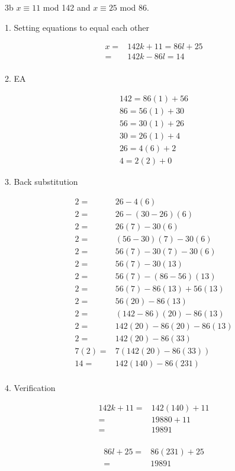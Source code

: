 \begin{question}{3b}
$x \equiv 11$ mod 142 and $x \equiv 25$ mod 86.

1. Setting equations to equal each other

\begin{align*}
x =& 142k +11 = 86l + 25\\
=& 142k -86l  = 14\\
\end{align*}

2. EA

\begin{align*}
142 = 86(1) + 56 \\
86  = 56(1) + 30 \\
56  = 30(1) + 26 \\
30  = 26(1) + 4 \\
26  = 4(6)  + 2 \\
4   = 2(2)  + 0
\end{align*}

3. Back substitution

\begin{align*}
2 =& 26 - 4(6) \\
2 =& 26 - (30 - 26)(6) \\ 
2 =& 26(7) - 30(6)\\
2 =& (56-30)(7) - 30(6)\\ 
2 =& 56(7) - 30(7) - 30(6)\\ 
2 =& 56(7) - 30(13)\\ 
2 =& 56(7) - (86-56)(13)\\ 
2 =& 56(7) -86(13) +56(13)\\ 
2 =& 56(20) -86(13)\\
2 =& (142-86)(20) -86(13)\\
2 =& 142(20) -86(20) -86(13)\\
2 =& 142(20) -86(33)\\
7(2) =& 7(142(20) -86(33))\\
14 =& 142(140) -86(231)\\
\end{align*}

4. Verification

\begin{align*}
142k + 11 =& 142(140) + 11\\
=& 19880 + 11\\ 
=& 19891\\ 
\end{align*}

\begin{align*}
86l + 25 =& 86(231) + 25\\
=& 19891\\ 
\end{align*}

\end{question}

